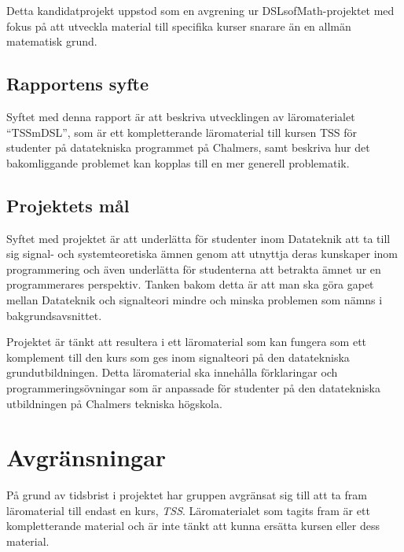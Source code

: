 \documentclass[12pt,a4paper,twoside,openright]{article}
\begin{document}
Detta kandidatprojekt uppstod som en avgrening ur DSLsofMath-projektet med fokus
på att utveckla material till specifika kurser snarare än en allmän matematisk grund.

\subsection{Rapportens syfte}


Syftet med denna rapport är att beskriva utvecklingen av läromaterialet
``\gls{TSSmDSL}'', som är ett kompletterande läromaterial till kursen TSS
för studenter på datatekniska programmet på Chalmers, samt beskriva hur det
bakomliggande problemet kan kopplas till en mer generell problematik.

\subsection{Projektets mål}
Syftet med projektet är att underlätta för studenter inom Datateknik att
ta till sig signal- och systemteoretiska ämnen genom att utnyttja deras
kunskaper inom programmering och även underlätta för studenterna att betrakta
ämnet ur en programmerares perspektiv. Tanken bakom detta är att man ska göra
gapet mellan Datateknik och signalteori mindre och minska problemen som nämns
i bakgrundsavsnittet.

Projektet är tänkt att resultera i ett läromaterial som kan fungera som ett
komplement till den kurs som ges inom signalteori på den datatekniska
grund\-utbildningen. Detta läromaterial ska innehålla förklaringar och
programmeringsövningar som är anpassade för studenter på den datatekniska
utbildningen på Chalmers tekniska högskola.

\section{Avgränsningar}

På grund av tidsbrist i projektet har gruppen avgränsat sig till att ta fram
läromaterial till endast en kurs, \textit{TSS}. Läromaterialet som tagits fram är ett
kompletterande material och är inte tänkt att kunna ersätta kursen eller
dess material.
\end{document}

